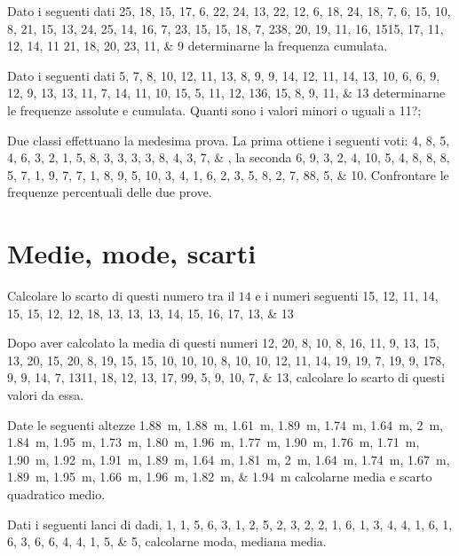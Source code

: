 \begin{esercizio}
Dato i seguenti dati \numlist{25; 18; 15; 17; 6; 22; 24; 13; 22; 12; 6; 18; 24; 18; 7; 6; 15; 10; 8; 21; 15; 13;
	24; 25; 14; 16; 7; 23; 15; 15; 18; 7; 23 8; 20; 19; 11; 16; 15 15; 17; 11; 12; 14; 11
	21; 18; 20; 23; 11; 9} determinarne la frequenza cumulata.
\end{esercizio}
\begin{esercizio}
	\begin{esercizio}
		Dato i seguenti dati \numlist{5; 7; 8; 10; 12; 11; 13; 8; 9; 9; 14; 12; 11; 14; 13; 10; 6; 6; 9; 12; 9; 13; 13; 11;
			7; 14; 11; 10; 15; 5; 11; 12; 13 6; 15; 8; 9; 11; 13} determinarne le frequenze assolute e cumulata. Quanti sono i valori minori o uguali a \num{11}?;
	\end{esercizio}
	\begin{esercizio}
	Due classi effettuano la medesima prova. La prima ottiene i seguenti voti: \numlist{4; 8; 5; 4; 6; 3; 2; 1; 5; 8; 3; 3; 3; 3; 8; 4; 3; 7;}, la seconda \numlist{6; 9; 3; 2; 4; 10; 5; 4; 8; 8; 8; 5; 7; 1; 9; 7; 7; 1; 8; 9; 5; 10; 3; 4; 1; 6; 2; 3; 5;
		8; 2; 7; 8 8; 5; 10}. Confrontare le frequenze percentuali delle due prove.
\end{esercizio} 
\section{Medie, mode, scarti}
\begin{esercizio}
	Calcolare lo scarto di questi numero tra il $14$ e i numeri seguenti \numlist{15;12; 11; 14; 15; 15; 12; 12; 18; 13; 13; 13; 14; 15; 16; 17; 13; 13}
\end{esercizio}
\begin{esercizio}
	Dopo aver calcolato la media di questi numeri \numlist{12; 20; 8; 10; 8; 16; 11; 9; 13; 15; 13; 20; 15; 20; 8; 19; 15; 15; 10; 10; 10; 8;
		10; 10; 12; 11; 14; 19; 19; 7; 19; 9; 17 8; 9; 9; 14; 7; 13 11; 18; 12; 13; 17; 9 9; 5;
		9; 10; 7; 13}, calcolare lo scarto di questi valori da essa.
\end{esercizio}
\begin{esercizio}
	 Date le seguenti altezze \SIlist{1.88; 1.88; 1.61; 1.89; 1.74; 1.64; 2; 1.84; 1.95; 1.73; 1.80; 1.96; 1.77; 1.90; 1.76; 1.71; 1.90;
		1.92; 1.91; 1.89; 1.64; 1.81; 2; 1.64; 1.74; 1.67; 1.89; 1.95; 1.66; 1.96; 1.82; 1.94}{\m} calcolarne media e scarto quadratico medio.
\end{esercizio}
\begin{esercizio}
Dati i seguenti lanci di dadi, \numlist{1; 1; 5; 6; 3; 1; 2; 5; 2; 3; 2; 2; 1; 6; 1; 3; 4; 4; 1; 6; 1; 6; 3; 6; 6; 4; 4; 1; 5; 5}, calcolarne moda, mediana media.
\end{esercizio}
\begin{esercizio}
	

\end{esercizio}
\end{esercizio}
